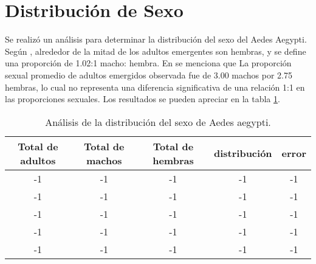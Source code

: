 \section{Distribución de Sexo}
Se realizó un análisis para determinar la distribución del sexo del Aedes Aegypti. Según 
\cite{otero2006stochastic}, alrededor de la mitad de los adultos emergentes son hembras, 
y se define una proporción de 1.02:1 macho: hembra. En \cite{manrique1998desarrollo} se menciona que
La proporción sexual promedio de adultos emergidos observada fue de 3.00 machos por 2.75 hembras, lo cual
no representa una diferencia significativa de una relación 1:1 en las proporciones sexuales. Los
resultados se pueden apreciar en la tabla \ref{tab:distribucion-sexo-test}.

\begin{table}
\begin{center}
\begin{tabular}{c c c c c }
Total de adultos & Total de machos & Total de hembras & distribución & error\\
\hline
-1  & -1  & -1 & -1 & -1   \\
-1  & -1  & -1 & -1 & -1   \\
-1  & -1  & -1 & -1 & -1   \\
-1  & -1  & -1 & -1 & -1   \\
-1  & -1  & -1 & -1 & -1   \\
\end{tabular}
\caption{ \label{tab:distribucion-sexo-test} Análisis de la distribución del sexo de Aedes aegypti.}
\end{center}
\end{table}
